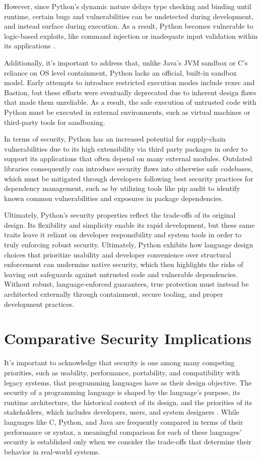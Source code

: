 \documentclass[conference]{IEEEtran}
\begin{document}
However, since Python's dynamic nature delays type checking and binding until runtime, certain bugs and vulnerabilities can be undetected during development, and instead surface during execution. As a result, Python becomes vulnerable to logic-based exploits, like command injection or inadequate input validation within its applications \cite{Bogaerts2024}.

Additionally, it's important to address that, unlike Java’s JVM sandbox or C’s reliance on OS level containment, Python lacks an official, built-in sandbox model. Early attempts to introduce restricted execution modes include rexec and Bastion, but these efforts were eventually deprecated due to inherent design flaws that made them unreliable. As a result, the safe execution of untrusted code with Python must be executed in external environments, such as virtual machines or third-party tools for sandboxing.

In terms of security, Python has an increased potential for supply-chain vulnerabilities due to its high extensibility via third party packages in order to support its applications that often depend on many external modules. Outdated libraries consequently can introduce security flaws into otherwise safe codebases, which must be mitigated through developers following best security practices for dependency management, such as by utilizing tools like pip audit to identify known common vulnerabilities and exposures in package dependencies.

Ultimately, Python’s security properties reflect the trade-offs of its original design. Its flexibility and simplicity enable its rapid development, but these same traits leave it reliant on developer responsibility and system tools in order to truly enforcing robust security. Ultimately, Python exhibits how language design choices that prioritize usability and developer convenience over structural enforcement can undermine native security, which then highlights the risks of leaving out safeguards against untrusted code and vulnerable dependencies. Without robust, language-enforced guarantees, true protection must instead be architected externally through containment, secure tooling, and proper development practices.



\section{Comparative Security Implications}

It's important to acknowledge that security is one among many competing priorities, such as usability, performance, portability, and compatibility with legacy systems, that programming languages have as their design objective. The security of a programming language is shaped by the language’s purpose, its runtime architecture, the historical context of its design, and the priorities of its stakeholders, which includes developers, users, and system designers \cite{Elahi2007}. While languages like C, Python, and Java are frequently compared in terms of their performance or syntax, a meaningful comparison for each of these languages' security is established only when we consider the trade-offs that determine their behavior in real-world systems.
\end{document}
